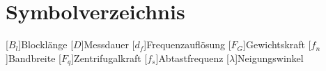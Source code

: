 \chapter*{Symbolverzeichnis}
\begin{acronym}[BreiteDerLinkenSpalte]
[$B_l$]{Blocklänge}
[$D$]{Messdauer}
[$d_f$]{Frequenzauflösung}
[$F_G$]{Gewichtskraft}
[$f_n$]{Bandbreite}
[$F_q$]{Zentrifugalkraft}
[$f_s$]{Abtastfrequenz}
[$\lambda$]{Neigungswinkel}
\end{acronym}